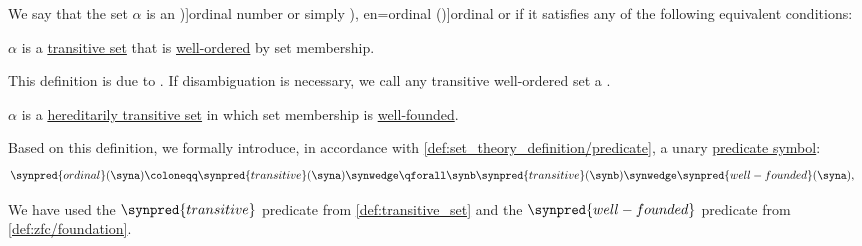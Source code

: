\begin{definition}\label{def:ordinal}
  We say that the set \( \alpha \) is an \term[en=ordinal number (\cite[28]{Jech2006SetTheory})]{ordinal number} or simply \term[ru=ординал (\cite[\S 1.5.3]{КусраевКутателадзе2005БулевозначныйАнализ}), en=ordinal (\cite[def. I.7.3]{Kunen2013SetTheory})]{ordinal} or  if it satisfies any of the following equivalent conditions:
  \begin{thmenum}
     \( \alpha \) is a \hyperref[def:transitive_set]{transitive set} that is \hyperref[def:well_ordered_set]{well-ordered} by set membership.

    This definition is due to \textcite[203]{VonNeumann1923TransfinitenZahlen}. If disambiguation is necessary, we call any transitive well-ordered set a .

    \mimprovised \( \alpha \) is a \hyperref[def:hereditarily_transitive_set]{hereditarily transitive set} in which set membership is \hyperref[def:well_founded_relation]{well-founded}.

    Based on this definition, we formally introduce, in accordance with \cref{def:set_theory_definition/predicate}, a unary \hyperref[def:fol_signature/predicate]{predicate symbol}:
    \begin{align*}
      \synpred{ordinal}(\syna) &\coloneqq \synpred{transitive}(\syna) \synwedge \qforall \synb \synpred{transitive}(\synb) \synwedge \synpred{well-founded}(\syna),
    \end{align*}

    We have used the \( \synpred{transitive} \) predicate from \cref{def:transitive_set} and the \( \synpred{well-founded} \) predicate from \cref{def:zfc/foundation}.
  \end{thmenum}
\end{definition}
